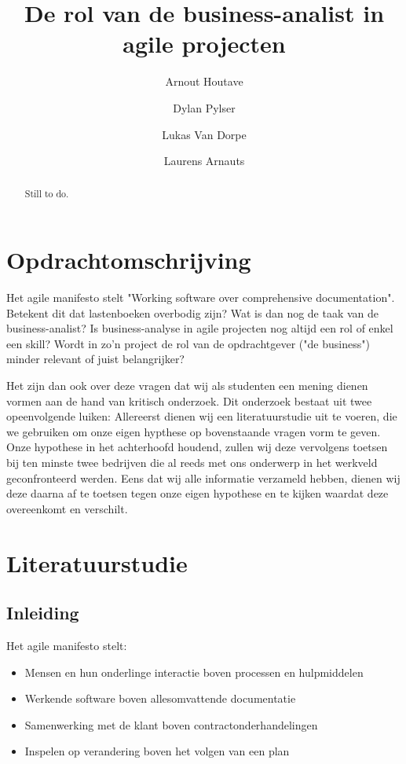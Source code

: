 \documentclass{hogent-article}
\title{De rol van de business-analist in agile projecten}
\author{Arnout Houtave}
\author{Dylan Pylser}
\author{Lukas Van Dorpe}
\author{Laurens Arnauts}
\begin{document}
\begin{abstract}
 Still to do.
\end{abstract}

\tableofcontents


\section{Opdrachtomschrijving}

Het agile manifesto stelt "Working software over comprehensive documentation". Betekent dit dat lastenboeken overbodig zijn? Wat is dan nog de taak van de business-analist? Is business-analyse in agile projecten nog altijd een rol of enkel een skill? Wordt in zo'n project de rol van de opdrachtgever ("de business") minder relevant of juist belangrijker?  

Het zijn dan ook over deze vragen dat wij als studenten een mening dienen vormen aan de hand van kritisch onderzoek. Dit onderzoek bestaat uit twee opeenvolgende luiken: Allereerst dienen wij een literatuurstudie uit te voeren, die we gebruiken om onze eigen hypthese op bovenstaande vragen vorm te geven. Onze hypothese in het achterhoofd houdend, zullen wij deze vervolgens toetsen bij ten minste twee bedrijven die al reeds met ons onderwerp in het werkveld geconfronteerd werden. Eens dat wij alle informatie verzameld hebben, dienen wij deze daarna af te toetsen tegen onze eigen hypothese en te kijken waardat deze overeenkomt en verschilt.


\section{Literatuurstudie}

\subsection{Inleiding}

Het agile manifesto stelt:

\begin{itemize}
  \item Mensen en hun onderlinge interactie boven processen en hulpmiddelen
  \item Werkende software boven allesomvattende documentatie
  \item Samenwerking met de klant boven contractonderhandelingen
  \item Inspelen op verandering boven het volgen van een plan
\end{itemize}
\autocite{fowler2001agile}
\end{document}
